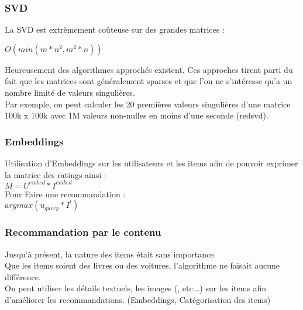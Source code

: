 \begin{frame}
  \frametitle{SVD}
  La SVD est extrèmement coûteuse sur des grandes matrices :
  \begin{center}
    $O(min(m*n^2,m^2*n))$
  \end{center}
  Heureusement des algorithmes approchés existent. Ces approches tirent parti du fait que les matrices sont généralement sparses et que l'on ne s'intéresse qu'a un nombre limité de valeurs singulières. \\
  Par exemple, on peut calculer les 20 premières valeurs singulières d'une matrice 100k x 100k avec 1M valeurs non-nulles en moins d'une seconde (redsvd).
\end{frame}

\begin{frame}
  \frametitle{Embeddings}
  Utilisation d'Embeddings sur les utilisateurs et les items afin de pouvoir exprimer la matrice des ratings ainsi : \\
  $M = U^{embed}*I^{embed}$ \\
  \newline
  Pour Faire une recommandation :\\
  $argmax(u_{query}*I^t)$
  
\end{frame}

\begin{frame}
  \frametitle{Recommandation par le contenu}
  Jusqu'à présent, la nature des items était sans importance.\\
  Que les items soient des livres ou des voitures, l'algorithme ne faisait aucune différence. \\
  On peut utiliser les détails textuels, les images (, etc...) sur les items afin d'améliorer les recommandations. (Embeddings, Catégorisation des items)
\end{frame}
